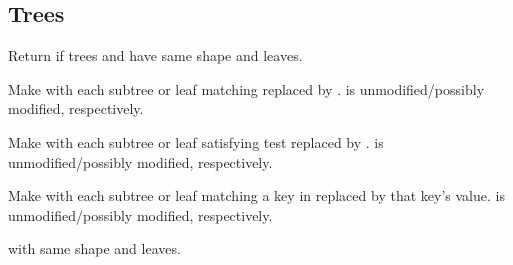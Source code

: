 \subsection{Trees} 
\begin{LIST}{1cm}

  {
  Return \retval{\T} if trees  and  have same
  shape and  leaves.
  }

  {
  Make  with each subtree or leaf matching  replaced by
  .  is unmodified/possibly modified, respectively.
  }

  {
  Make  with each subtree or leaf
  satisfying test replaced by
  .  is unmodified/possibly modified, respectively.
  }

  {
  Make  with each subtree or leaf matching
  a key in  replaced by that key's value.
   is unmodified/possibly modified, respectively.
  }

  {
     with same shape and leaves.
  }

\end{LIST}



